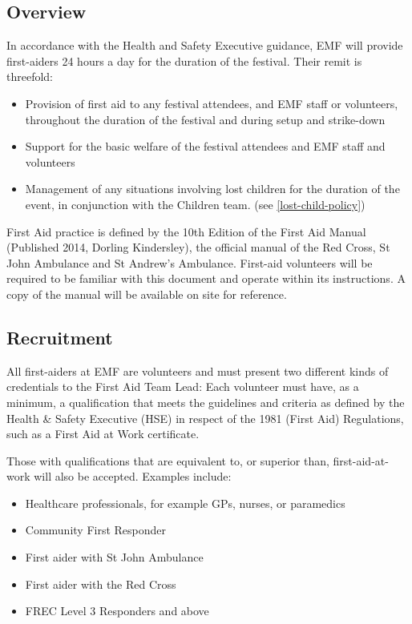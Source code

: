 \subsection{Overview}
In accordance with the Health and Safety Executive guidance, EMF will
provide first-aiders 24 hours a day for the duration of the festival.
Their remit is threefold:

\begin{itemize}
  \item Provision of first aid to any festival attendees, and EMF staff or
  volunteers, throughout the duration of the festival and during setup and
  strike-down
  \item Support for the basic welfare of the festival attendees and EMF
  staff and volunteers
  \item Management of any situations involving lost children for the duration of
  the event, in conjunction with the Children team. (see \cref{lost-child-policy})
\end{itemize}

First Aid practice is defined by the 10th Edition of the First Aid Manual
(Published 2014, Dorling Kindersley), the official manual of the Red Cross, St
John Ambulance and St Andrew’s Ambulance. First-aid volunteers will be
required to be familiar with this document and operate within its instructions.
A copy of the manual will be available on site for reference.


\subsection{Recruitment}
All first-aiders at EMF are volunteers and must present two different kinds of
credentials to the First Aid Team Lead: Each volunteer must have, as a minimum,
a qualification that meets the guidelines and criteria as defined by the Health
\& Safety Executive (HSE) in respect of the 1981 (First Aid) Regulations, such
as a First Aid at Work certificate.

Those with qualifications that are equivalent to, or superior than,
first-aid-at-work will also be accepted. Examples include:

\begin{itemize}
  \item Healthcare professionals, for example GPs, nurses, or paramedics
  \item Community First Responder
  \item First aider with St John Ambulance
  \item First aider with the Red Cross
  \item FREC Level 3 Responders and above
\end{itemize}

